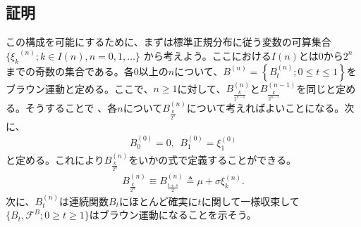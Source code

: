 \documentclass[12pt]{jarticle}
\begin{document}
\subsection{証明}
この構成を可能にするために、まずは標準正規分布に従う変数の可算集合$\displaystyle \{{\mathscr{\xi}_k}^{(n)};k\in I(n),n = 0,1,\dots\}$
から考えよう。ここにおける$\displaystyle I(n)$とは$\displaystyle 0から2^n$までの奇数の集合である。各$0$以上の$ \displaystyle n$について、$\displaystyle B^{(n)} = \left\{{B^{(n)}_t} ;0 \leq t \leq 1\right\}$をブラウン運動と定める。ここで、$n \geq 1$に対して、$\displaystyle {B^{(n)}_{\frac{k}{2^{n-1}}}}$と$\displaystyle {B^{(n-1)}_{\frac{k}{2^{n-1}}}}$を同じと定める。そうすることで
、各$n$について$\displaystyle {B^{(n)}_{\frac{k}{2^{n}}}}$について考えればよいことになる。次に、
\begin{align*}
  \label{04}
  \displaystyle B^{(0)}_0 = 0, \ \ B^{(0)}_1 = \xi^{(0)}_1
  \tag{4}
\end{align*}
と定める。これにより$\displaystyle {B^{(n)}_{\frac{k}{2^{n}}}}$をいかの式で定義することができる。
\begin{align*}
  \label{05}
  \displaystyle {B^{(n)}_{\frac{k}{2^{n}}}}\equiv {B^{(n)}_{\frac{t + s}{2}}} \triangleq \mu + \sigma \xi^{(n)}_k.
  \tag{5}
\end{align*}
次に、$\displaystyle B^{(n)}_t$は連続関数$\displaystyle B_t$にほとんど確実に$\displaystyle t$に関して一様収束して$\displaystyle \{B_t,\mathscr{F}^B;0 \geq t \geq 1\}$はブラウン運動になることを示そう。
\end{document}

